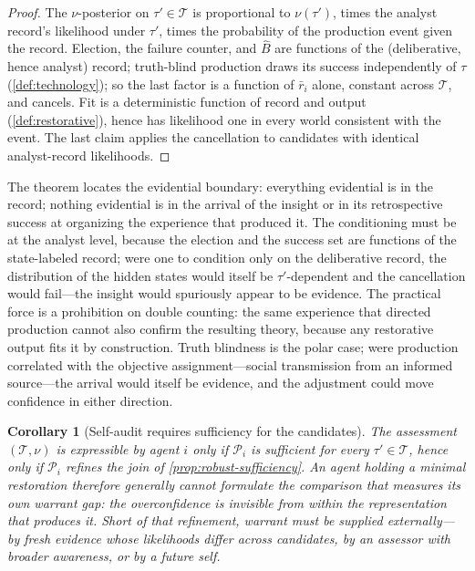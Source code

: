 \documentclass[11pt]{article}
\newtheorem{corollary}[assumption]{Corollary}
\theoremstyle{definition}
\begin{document}
\begin{proof}
The $\nu$-posterior on $\tau'\in\mathcal T$ is proportional to $\nu(\tau')$,
times the analyst record's likelihood under $\tau'$, times the probability of
the production event given the record.  Election, the failure counter, and
$\widehat B$ are functions of the (deliberative, hence analyst) record;
truth-blind production draws its success independently of $\tau$
(\cref{def:technology}); so the last factor is a function of $\bar r_i$ alone,
constant across $\mathcal T$, and cancels.  Fit is a deterministic function of
record and output (\cref{def:restorative}), hence has likelihood one in every
world consistent with the event.  The last claim applies the cancellation to
candidates with identical analyst-record likelihoods.
\end{proof}

The theorem locates the evidential boundary: everything evidential is in the
record; nothing evidential is in the arrival of the insight or in its
retrospective success at organizing the experience that produced it.  The
conditioning must be at the analyst level, because the election and the
success set are functions of the state-labeled record; were one to condition
only on the deliberative record, the distribution of the hidden states would
itself be $\tau'$-dependent and the cancellation would fail---the insight
would spuriously appear to be evidence.  The practical force is a prohibition
on double counting: the same experience that directed production cannot also
confirm the resulting theory, because any restorative output fits it by
construction.  Truth blindness is the polar case; were production correlated
with the objective assignment---social transmission from an informed
source---the arrival would itself be evidence, and the adjustment could move
confidence in either direction.

\begin{corollary}[Self-audit requires sufficiency for the candidates]
\label{cor:self-audit}
The assessment $(\mathcal T,\nu)$ is expressible by agent $i$ only if
$\mathcal P_i$ is sufficient for every $\tau'\in\mathcal T$, hence only if
$\mathcal P_i$ refines the join of \cref{prop:robust-sufficiency}.  An agent
holding a minimal restoration therefore generally cannot formulate the
comparison that measures its own warrant gap: the overconfidence is
invisible from within the representation that produces it.  Short of that
refinement, warrant must be supplied externally---by fresh evidence whose
likelihoods differ across candidates, by an assessor with broader awareness,
or by a future self.
\end{corollary}
\end{document}
